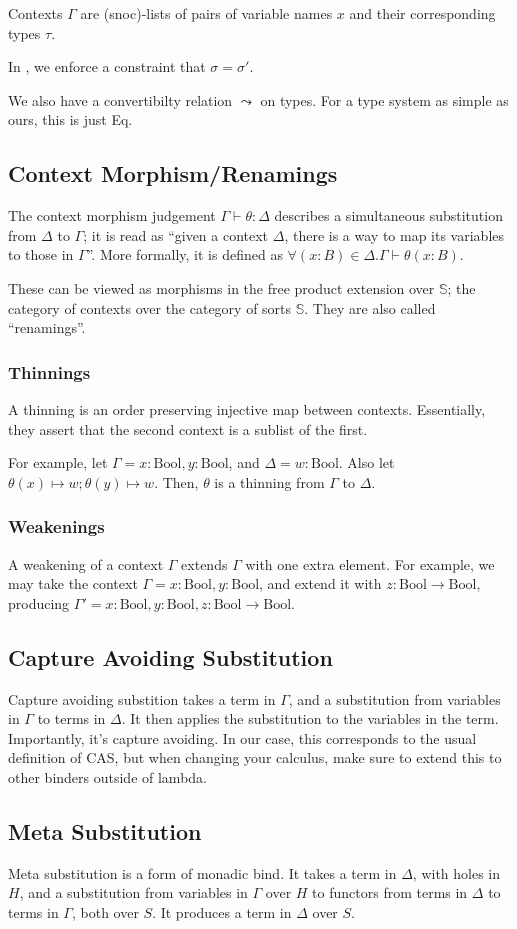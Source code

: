 Contexts $\Gamma$ are (snoc)-lists of pairs of variable names $x$ and their corresponding types $\tau$.

In \Elim{$\to$}, we enforce a constraint that $\sigma = \sigma'$.

We also have a convertibilty relation $\leadsto$ on types. For a type system as simple as ours, this is just Eq.

\subsection{Context Morphism/Renamings}
The context morphism judgement $\Gamma \vdash \theta : \Delta$ describes a simultaneous substitution from $\Delta$ to $\Gamma$; it is read as ``given a context $\Delta$, there is a way to map its variables to those in $\Gamma$''. More formally, it is defined as $\forall (x : B) \in \Delta. \Gamma \vdash \theta (x : B)$.

These can be viewed as morphisms in the free product extension over $\mathbb{S}$; the category of contexts over the category of sorts $\mathbb{S}$. They are also called ``renamings''.

\subsubsection{Thinnings}
A thinning is an order preserving injective map between contexts. Essentially, they assert that the second context is a sublist of the first.

For example, let $\Gamma = x : \mathrm{Bool}, y : \mathrm{Bool}$, and $\Delta = w : \mathrm{Bool}$. Also let $\theta(x) \mapsto w; \theta(y) \mapsto w$. Then, $\theta$ is a thinning from $\Gamma$ to $\Delta$.

\subsubsection{Weakenings}
A weakening of a context $\Gamma$ extends $\Gamma$ with one extra element. For example, we may take the context $\Gamma = x : \mathrm{Bool}, y : \mathrm{Bool}$, and extend it with $z : \mathrm{Bool} \to \mathrm{Bool}$, producing $\Gamma' = x : \mathrm{Bool}, y : \mathrm{Bool}, z : \mathrm{Bool} \to \mathrm{Bool}$.


\subsection{Capture Avoiding Substitution}
Capture avoiding substition takes a term in $\Gamma$, and a substitution from variables in $\Gamma$ to terms in $\Delta$. It then applies the substitution to the variables in the term. Importantly, it's capture avoiding. In our case, this corresponds to the usual definition of CAS, but when changing your calculus, make sure to extend this to other binders outside of lambda.

\subsection{Meta Substitution}
Meta substitution is a form of monadic bind.
It takes a term in $\Delta$, with holes in $H$, and a substitution from variables in $\Gamma$ over $H$ to functors from terms in $\Delta$ to terms in $\Gamma$, both over $S$. It produces a term in $\Delta$ over $S$.
